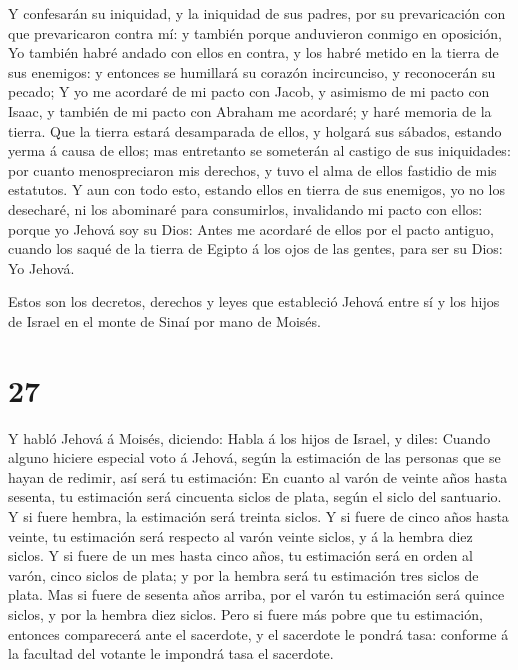  Y confesarán su iniquidad, y la iniquidad de sus padres,
por su prevaricación con que prevaricaron contra mí: y también porque
anduvieron conmigo en oposición,  Yo también habré andado
con ellos en contra, y los habré metido en la tierra de sus enemigos: y
entonces se humillará su corazón incircunciso, y reconocerán su pecado;
 Y yo me acordaré de mi pacto con Jacob, y asimismo de mi
pacto con Isaac, y también de mi pacto con Abraham me acordaré; y haré
memoria de la tierra.  Que la tierra estará desamparada de
ellos, y holgará sus sábados, estando yerma á causa de ellos; mas
entretanto se someterán al castigo de sus iniquidades: por cuanto
menospreciaron mis derechos, y tuvo el alma de ellos fastidio de mis
estatutos.  Y aun con todo esto, estando ellos en tierra de
sus enemigos, yo no los desecharé, ni los abominaré para consumirlos,
invalidando mi pacto con ellos: porque yo Jehová soy su Dios:
 Antes me acordaré de ellos por el pacto antiguo, cuando
los saqué de la tierra de Egipto á los ojos de las gentes, para ser su
Dios: Yo Jehová.

 Estos son los decretos, derechos y leyes que estableció
Jehová entre sí y los hijos de Israel en el monte de Sinaí por mano de
Moisés.

\hypertarget{section-26}{%
\section{27}\label{section-26}}

 Y habló Jehová á Moisés, diciendo:  Habla á los
hijos de Israel, y diles: Cuando alguno hiciere especial voto á Jehová,
según la estimación de las personas que se hayan de redimir, así será tu
estimación:  En cuanto al varón de veinte años hasta
sesenta, tu estimación será cincuenta siclos de plata, según el siclo
del santuario.  Y si fuere hembra, la estimación será
treinta siclos.  Y si fuere de cinco años hasta veinte, tu
estimación será respecto al varón veinte siclos, y á la hembra diez
siclos.  Y si fuere de un mes hasta cinco años, tu
estimación será en orden al varón, cinco siclos de plata; y por la
hembra será tu estimación tres siclos de plata.  Mas si
fuere de sesenta años arriba, por el varón tu estimación será quince
siclos, y por la hembra diez siclos.  Pero si fuere más
pobre que tu estimación, entonces comparecerá ante el sacerdote, y el
sacerdote le pondrá tasa: conforme á la facultad del votante le impondrá
tasa el sacerdote.

